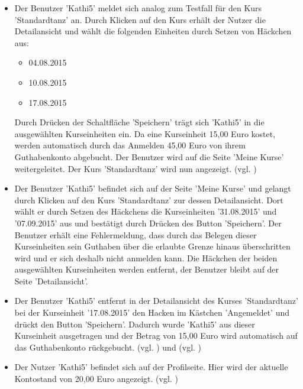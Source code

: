 \documentclass[a4paper]{scrreprt}
\begin{document}
\begin{itemize}
				\item {}
				Der Benutzer 'Kathi5' meldet sich analog zum Testfall  für den Kurs 'Standardtanz' an. Durch Klicken auf den Kurs erhält der Nutzer die Detailansicht und wählt die folgenden Einheiten durch Setzen von Häckchen aus:
					\begin{itemize}
						\item 04.08.2015 
						\item 10.08.2015 
						\item 17.08.2015 
					\end{itemize}	
				Durch Drücken der Schaltfläche 'Speichern' trägt sich 'Kathi5' in die ausgewählten Kurseinheiten ein. Da eine Kurseinheit 15,00 Euro kostet, werden automatisch durch das Anmelden 45,00 Euro von ihrem Guthabenkonto abgebucht. Der Benutzer wird auf die Seite 'Meine Kurse' weitergeleitet. Der Kurs 'Standardtanz' wird nun angezeigt. (vgl. )
		 
				\item {}
				Der Benutzer 'Kathi5' befindet sich auf der Seite 'Meine Kurse' und gelangt durch Klicken auf den Kurs 'Standardtanz' zur dessen Detailansicht. Dort wählt er durch Setzen des Häckchens die Kurseinheiten '31.08.2015' und '07.09.2015' aus und bestätigt durch Drücken des Button 'Speichern'. Der Benutzer erhält eine Fehlermeldung, dass durch das Belegen dieser Kurseinheiten sein Guthaben über die erlaubte Grenze hinaus überschritten wird und er sich deshalb nicht anmelden kann. Die Häckchen der beiden ausgewählten Kurseinheiten werden entfernt, der Benutzer bleibt auf der Seite 'Detailansicht'.
				
				\item {}
				Der Benutzer 'Kathi5' entfernt in der Detailansicht des Kurses 'Standardtanz' bei der Kurseinheit '17.08.2015' den Hacken im Kästchen 'Angemeldet' und drückt den Button 'Speichern'. Dadurch wurde 'Kathi5' aus dieser Kurseinheit ausgetragen und der Betrag von 15,00 Euro wird automatisch auf das Guthabenkonto rückgebucht.  (vgl. ) und (vgl. )
				
				\item {}
				Der Nutzer 'Kathi5' befindet sich auf der Profilseite. Hier wird der aktuelle Kontostand von 20,00 Euro angezeigt. (vgl. )
				

\end{itemize}
\end{document}
